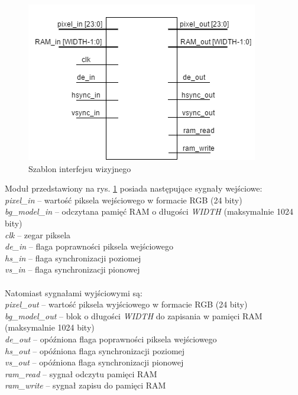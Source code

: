 	\begin{figure}[h!]
			\centering
			\includegraphics[scale=0.75]{img/4/vision_if.png}
			\caption{Szablon interfejsu wizyjnego} %
			\label{fig:fpga_vision_if}
	\end{figure}

\noindent Moduł przedstawiony na rys. \ref{fig:fpga_vision_if} posiada następujące sygnały wejściowe:\\
\-\hspace{1cm} \textit{pixel\_in} -- wartość piksela wejściowego w formacie RGB (24 bity)\\
\-\hspace{1cm} \textit{bg\_model\_in} -- odczytana pamięć RAM o długości \textit{WIDTH} (maksymalnie 1024 bity)\\
\-\hspace{1cm} \textit{clk} -- zegar piksela\\
\-\hspace{1cm} \textit{de\_in} -- flaga poprawności piksela wejściowego\\
\-\hspace{1cm} \textit{hs\_in} -- flaga synchronizacji poziomej\\
\-\hspace{1cm} \textit{vs\_in} -- flaga synchronizacji pionowej\\\\
%
Natomiast sygnałami wyjściowymi są:\\
\-\hspace{1cm} \textit{pixel\_out} -- wartość piksela wyjściowego w formacie RGB (24 bity)\\
\-\hspace{1cm} \textit{bg\_model\_out} -- blok o długości \textit{WIDTH} do zapisania w pamięci RAM (maksymalnie 1024 bity)\\
\-\hspace{1cm} \textit{de\_out} -- opóźniona flaga poprawności piksela wejściowego\\
\-\hspace{1cm} \textit{hs\_out} -- opóźniona flaga synchronizacji poziomej\\
\-\hspace{1cm} \textit{vs\_out} -- opóźniona flaga synchronizacji pionowej\\
\-\hspace{1cm} \textit{ram\_read} -- sygnał odczytu pamięci RAM\\
\-\hspace{1cm} \textit{ram\_write} -- sygnał zapisu do pamięci RAM

